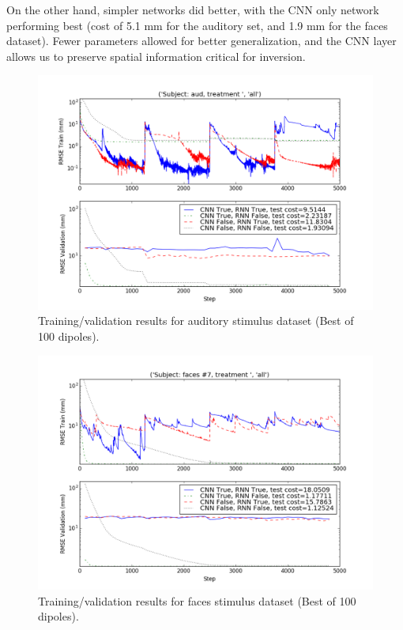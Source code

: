 \documentclass[journal,12pt,onecolumn,draftclsnofoot]{IEEEtran}
\begin{document}
On the other hand, simpler networks did better, with the CNN only network performing best (cost of 5.1 mm for the auditory set, and 1.9 mm for the faces dataset). Fewer parameters allowed for better generalization, and the CNN layer allows us to preserve spatial information critical for inversion.
\begin{figure}[h!]
\centering
\includegraphics[width=5in]{finalplots/aud100}
\caption{Training/validation results for auditory stimulus dataset (Best of 100 dipoles).}
\label{fig:aud100}
\end{figure}

\begin{figure}[h!]
\centering
\includegraphics[width=5in]{finalplots/faces100}
\caption{Training/validation results for faces stimulus dataset (Best of 100 dipoles).}
\label{fig:faces100}
\end{figure}
\end{document}
